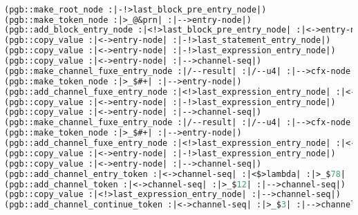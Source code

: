 \begin{lstlisting}[language = lisp, numbers = none, 
caption={Hypergraph Intermediate Representation},label={lst:figIR},
    basicstyle = \ttfamily\bfseries\scriptsize, linewidth = .9\linewidth] 

(pgb::make_root_node :|-!>last_block_pre_entry_node|)
(pgb::make_token_node :|>_@&prn| :|-->entry-node|)
(pgb::add_block_entry_node :|<!>last_block_pre_entry_node| :|<->entry-node|)
(pgb::copy_value :|<->entry-node| :|-!>last_statement_entry_node|)
(pgb::copy_value :|<->entry-node| :|-!>last_expression_entry_node|)
(pgb::copy_value :|<->entry-node| :|-->channel-seq|)
(pgb::make_channel_fuxe_entry_node :|/--result| :|/--u4| :|-->cfx-node|)
(pgb::make_token_node :|>_$#+| :|-->entry-node|)
(pgb::add_channel_fuxe_entry_node :|<!>last_expression_entry_node| :|<->entry-node| :|/--lambda| :|<->cfx-node|)
(pgb::copy_value :|<->entry-node| :|-!>last_expression_entry_node|)
(pgb::copy_value :|<->entry-node| :|-->channel-seq|)
(pgb::make_channel_fuxe_entry_node :|/--result| :|/--u4| :|-->cfx-node|)
(pgb::make_token_node :|>_$#+| :|-->entry-node|)
(pgb::add_channel_fuxe_entry_node :|<!>last_expression_entry_node| :|<->entry-node| :|/--lambda| :|<->cfx-node|)
(pgb::copy_value :|<->entry-node| :|-!>last_expression_entry_node|)
(pgb::copy_value :|<->entry-node| :|-->channel-seq|)
(pgb::add_channel_entry_token :|<->channel-seq| :|<$>lambda| :|>_$78| :|-->channel-seq|)
(pgb::add_channel_token :|<->channel-seq| :|>_$12| :|-->channel-seq|)
(pgb::copy_value :|<!>last_expression_entry_node| :|-->channel-seq|)
(pgb::add_channel_continue_token :|<->channel-seq| :|>_$3| :|-->channel-seq|)

\end{lstlisting}
